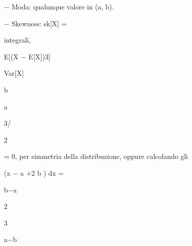\documentclass[a4paper,portrait,12pt]{article}
\begin{document}
\begin{flushleft}
$-$ Moda: qualunque valore in (a, b).
\end{flushleft}


\begin{flushleft}
$-$ Skewness: sk[X] =
\end{flushleft}


\begin{flushleft}
integrali,
\end{flushleft}





\begin{flushleft}
E[(X $-$ E[X])3]
\end{flushleft}


\begin{flushleft}
Var[X]
\end{flushleft}


\begin{flushleft}
b
\end{flushleft}


\begin{flushleft}
a
\end{flushleft}





3/


2





\begin{flushleft}
= 0, per simmetria della distribuzione, oppure calcolando gli
\end{flushleft}





\begin{flushleft}
(x $-$ a +2 b ) dx =
\end{flushleft}





\begin{flushleft}
b$-$a
\end{flushleft}


2





3





\begin{flushleft}
a$-$b
\end{flushleft}
\end{document}
